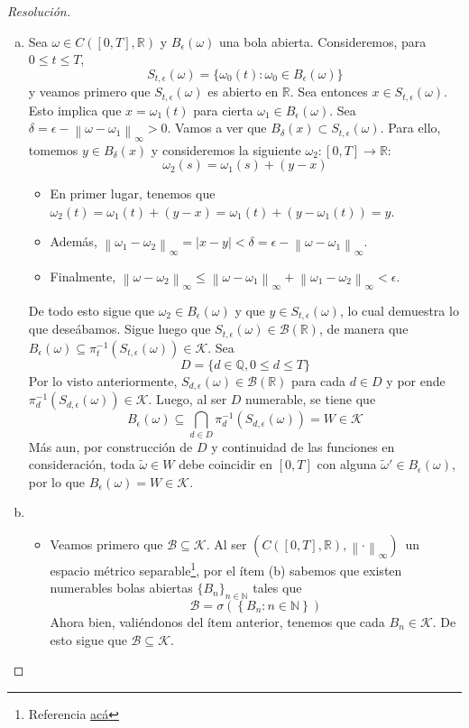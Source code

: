 \documentclass[a4paper,11pt]{article}
\newcommand{\norm}[1]{\left\lVert#1\right\rVert}
\newcommand{\normi}[1]{\norm{#1}_{\infty}}
\newcommand{\CT}{\ensuremath{C([0,T], \mathbb{R})}}
\newcommand{\CTesp}{\ensuremath{(C([0,T], \mathbb{R}), \norm{\cdot}_{\infty})}}
\newcommand{\Bor}[1]{\ensuremath{\mathcal{B}(#1)}}
\newcommand{\Bola}[2]{\ensuremath{B_{#2}(#1)}}
\begin{document}
\begin{proof}[Resoluci\'on]
\begin{enumerate}[a)]
    \item Sea $\omega \in \CT$ y \Bola{\omega}{\epsilon} una bola abierta.
    Consideremos, para $0 \leq t \leq T$,
    $$S_{t,\epsilon}(\omega) = \{ \omega_0(t) : \omega_0 \in \Bola{\omega}{\epsilon} \}$$
    y veamos primero que $S_{t,\epsilon}(\omega)$ es abierto en
    $\mathbb{R}$.
    Sea entonces $x \in S_{t,\epsilon}(\omega)$. Esto implica que $x = \omega_1(t)$ para
    cierta $\omega_1 \in \Bola{\omega}{\epsilon}$. Sea
    $\delta = \epsilon - \normi{\omega - \omega_1} > 0$. Vamos a ver que 
    $\Bola{x}{\delta} \subset S_{t,\epsilon}(\omega)$. Para ello, tomemos
    $y \in \Bola{x}{\delta}$ y consideremos la siguiente $\omega_2 : [0,T] \to \mathbb{R}$:
    $$\omega_2(s) = \omega_1(s) + (y - x)$$
    \begin{itemize}
        \item En primer lugar, tenemos que $\omega_2(t) = \omega_1(t) + (y - x)
        = \omega_1(t) + (y - \omega_1(t)) = y$.
        \item Además, $\normi{\omega_1 - \omega_2} = |x - y| < \delta = \epsilon - \normi{\omega - \omega_1}$.
        \item Finalmente, $\normi{\omega - \omega_2} \leq \normi{\omega - \omega_1} + \normi{\omega_1 - \omega_2}
        < \epsilon$.
    \end{itemize}
    De todo esto sigue que $\omega_2 \in \Bola{\omega}{\epsilon}$ y que $y \in S_{t,\epsilon}(\omega)$,
    lo cual demuestra lo que deseábamos. Sigue luego que $S_{t,\epsilon}(\omega) \in \Bor{\mathbb{R}}$, 
    de manera que
    $\Bola{\omega}{\epsilon} \subseteq \pi_t^{-1}(S_{t,\epsilon}(\omega)) \in \mathcal{K}$.
    Sea
    $$D = \{ d \in \mathbb{Q}, 0 \leq d \leq T \}$$
    Por lo visto anteriormente, $S_{d,\epsilon}(\omega) \in \Bor{\mathbb{R}}$
    para cada $d \in D$ y por ende $\pi_d^{-1}(S_{d,\epsilon}(\omega)) \in \mathcal{K}$.
    Luego, al ser $D$ numerable, se tiene que 
    $$\Bola{\omega}{\epsilon} \subseteq
        \bigcap_{d \in D}{\pi_d^{-1}(S_{d,\epsilon}(\omega))} = W \in \mathcal{K}$$
    Más aun, por construcción de $D$ y continuidad de las funciones en
    consideración, toda $\tilde{\omega} \in W$ debe coincidir en $[0,T]$ con
    alguna $\tilde{\omega}' \in \Bola{\omega}{\epsilon}$, por lo que
    $\Bola{\omega}{\epsilon} = W \in \mathcal{K}$.

    \item
        \begin{itemize}
            \item Veamos primero que $\mathcal{B} \subseteq \mathcal{K}$.
            Al ser \CTesp \, un espacio métrico separable\footnote{Referencia 
            \href{http://mathoverflow.net/questions/46011/is-the-space-of-continuous-functions-from-a-compact-metric-space-into-a-polish-s}{acá}},
            por el ítem (b) sabemos que existen numerables bolas abiertas $\{B_n\}_{n \in \mathbb{N}}$ tales que
            $$\mathcal{B} = \sigma\left(\left\{B_n : n \in \mathbb{N}\right\}\right)$$
            Ahora bien, valiéndonos del ítem anterior, tenemos que cada $B_n \in \mathcal{K}$.
            De esto sigue que $\mathcal{B} \subseteq \mathcal{K}$.


\end{itemize}
\end{enumerate}
\end{proof}
\end{document}
